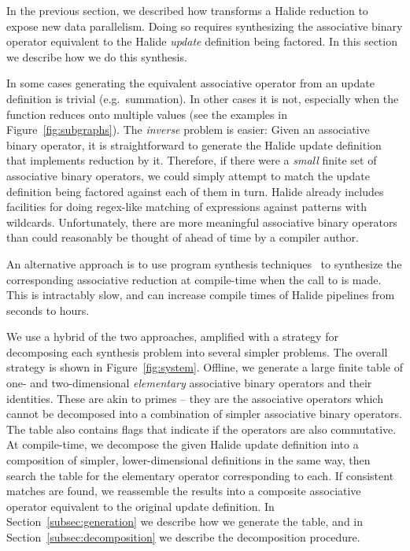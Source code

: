In the previous section, we described how  transforms a Halide reduction to expose new data parallelism. Doing so requires synthesizing the associative binary operator equivalent to the Halide \emph{update} definition being factored. In this section we describe how we do this synthesis.

In some cases generating the equivalent associative operator from an update definition is trivial (e.g.\ summation). In other cases it is not, especially when the function reduces onto multiple values (see the examples in Figure~\ref{fig:subgraphs}). The \emph{inverse} problem is easier: Given an associative binary operator, it is straightforward to generate the Halide update definition that implements reduction by it. Therefore, if there were a \emph{small} finite set of associative binary operators, we could simply attempt to match the update definition being factored against each of them in turn. Halide already includes facilities for doing regex-like matching of expressions against patterns with wildcards. Unfortunately, there are more meaningful associative binary operators than could reasonably be thought of ahead of time by a compiler author.

An alternative approach is to use program synthesis techniques~\cite{Solar-Lezama:2008:PSS:1714168, Torlak:2013:GSL:2509578.2509586} to synthesize the corresponding associative reduction at compile-time when the call to  is made. This is intractably slow, and can increase compile times of Halide pipelines from seconds to hours.

We use a hybrid of the two approaches, amplified with a strategy for decomposing each synthesis problem into several simpler problems. The overall strategy is shown in Figure~\ref{fig:system}.  Offline, we generate a large finite table of one- and two-dimensional \emph{elementary} associative binary operators and their identities. These are akin to primes -- they are the associative operators which cannot be decomposed into a combination of simpler associative binary operators. The table also contains flags that indicate if the operators are also commutative. At compile-time, we decompose the given Halide update definition into a composition of simpler, lower-dimensional definitions in the same way, then search the table for the elementary operator corresponding to each. If consistent matches are found, we reassemble the results into a composite associative operator equivalent to the original update definition. In Section~\ref{subsec:generation} we describe how we generate the table, and in Section~\ref{subsec:decomposition} we describe the decomposition procedure.

